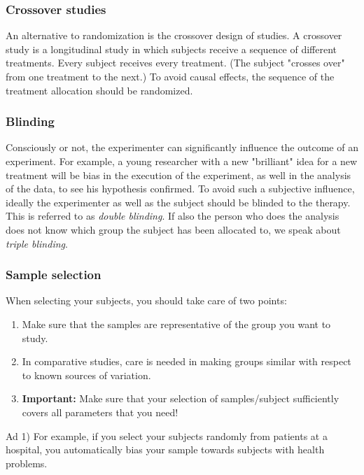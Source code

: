 \subsubsection{Crossover studies} 
An alternative to randomization is the \gls{crossover} design of studies. A crossover study is a longitudinal study in which subjects receive a sequence of different treatments. Every subject receives every treatment. (The subject "crosses over" from one treatment to the next.) To avoid causal effects, the sequence of the treatment allocation should be randomized.

\subsubsection{Blinding} 
Consciously or not, the experimenter can significantly influence the outcome of an experiment. For example, a young researcher with a new "brilliant" idea for a new treatment will be bias in the execution of the experiment, as well in the analysis of the data, to see his hypothesis confirmed. To avoid such a subjective influence, ideally the experimenter as well as the subject should be blinded to the therapy. This is referred to as \emph{double blinding}. If also the person who does the analysis does not know which group the subject has been allocated to, we speak about \emph{triple blinding}.

\subsubsection{Sample selection} 
When selecting your subjects, you should take care of two points:

\begin{enumerate}
  \item Make sure that the samples are representative of the group you want to study.
  \item In comparative studies, care is needed in making groups similar with respect to known sources of variation.
  \item \textbf{Important:} Make sure that your selection of samples/subject sufficiently covers all parameters that you need!
\end{enumerate}

Ad 1) For example, if you select your subjects randomly from patients at a hospital, you automatically bias your sample towards subjects with health problems.

